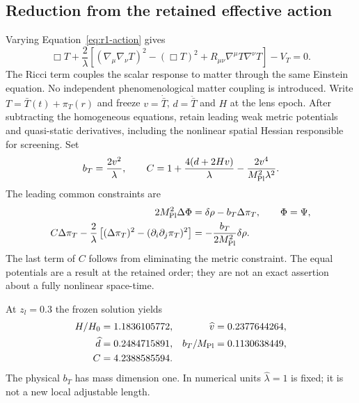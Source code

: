 \subsection{Reduction from the retained effective action}
Varying Equation~\eqref{eq:r1-action} gives
\begin{equation}
 \Box T+\frac{2}{\lambda}
 \left[(\nabla_\mu\nabla_\nu T)^2-(\Box T)^2+
 R_{\mu\nu}\nabla^\mu T\nabla^\nu T\right]-V_T=0 .
 \label{eq:scalar-covariant}
\end{equation}
The Ricci term couples the scalar response to matter through the same
Einstein equation. No independent phenomenological matter coupling is
introduced. Write $T=\bar T(t)+\pi_T(r)$ and freeze
$v=\dot{\bar T}$, $d=\ddot{\bar T}$ and $H$ at the lens epoch.
After subtracting the homogeneous equations, retain leading weak metric
potentials and quasi-static derivatives, including the nonlinear spatial
Hessian responsible for screening. Set
\begin{equation}
 b_T=\frac{2v^2}{\lambda},\qquad
 C=1+\frac{4(d+2Hv)}{\lambda}
      -\frac{2v^4}{M_{\rm Pl}^2\lambda^2}.
 \label{eq:coefficients}
\end{equation}
The leading common constraints are
\begin{align}
 2M_{\rm Pl}^2\Delta\Phi&=\delta\rho-b_T\Delta\pi_T,\qquad
 \Phi=\Psi,\label{eq:metric-source}\\
 C\Delta\pi_T-\frac2{\lambda}
 \left[(\Delta\pi_T)^2-(\partial_i\partial_j\pi_T)^2\right]
 &=-\frac{b_T}{2M_{\rm Pl}^2}\delta\rho .
 \label{eq:local-scalar}
\end{align}
The last term of $C$ follows from eliminating the metric constraint.
The equal potentials are a result at the retained order; they are not an
exact assertion about a fully nonlinear space-time.

At $z_l=0.3$ the frozen solution yields
\begin{equation}
 \begin{aligned}
 H/H_0&=1.1836105772, &\widehat v&=0.2377644264,\\
 \widehat d&=0.2484715891, &b_T/M_{\rm Pl}&=0.1130638449,\\
 C&=4.2388585594 .
 \end{aligned}
 \label{eq:coeff-values}
\end{equation}
The physical $b_T$ has mass dimension one. In numerical units
$\widehat\lambda=1$ is fixed; it is not a new local adjustable length.

